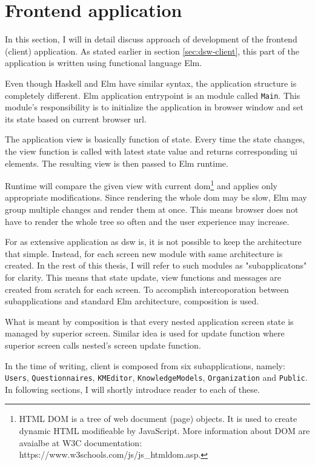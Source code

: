 \section{Frontend application}\label{sec:frontend-application}

In this section, I will in detail discuss approach of development of the frontend (client) application.
As stated earlier in section \ref{sec:dsw-client}, this part of the application is written using functional language Elm.

Even though Haskell and Elm have similar syntax, the application structure is completely different.
Elm application entrypoint is an module called \texttt{Main}.
This module's responsibility is to initialize the application in browser window and set its state based on current browser \gls{url}.

The application view is basically function of state.
Every time the state changes, the view function is called with latest state value and returns corresponding \gls{ui} elements.
The resulting view is then passed to Elm runtime.

Runtime will compare the given view with current \gls{dom}\footnote{HTML DOM is a tree of web document (page) objects. It is used to create dynamic HTML modifieable by JavaScript. More information about DOM are avaialbe at W3C documentation: https://www.w3schools.com/js/js\_htmldom.asp.} and applies only appropriate modifications.
Since rendering the whole \gls{dom} may be slow\cite{accelebrate-slow-dom}, Elm may group multiple changes and render them at once.
This means browser does not have to render the whole tree so often and the user experience may increase.

For as extensive application as \gls{dsw} is, it is not possible to keep the architecture that simple.
Instead, for each screen new module with same architecture is created.
In the rest of this thesis, I will refer to such modules as "subapplicatons" for clarity.
This means that state update, view functions and messages are created from scratch for each screen.
To accomplish intercoporation between subapplications and standard Elm architecture, composition is used.

What is meant by composition is that every nested application screen state is managed by superior screen.
Similar idea is used for update function where superior screen calls nested's screen update function.

In the time of writing, client is composed from six subapplications, namely: \texttt{Users}, \texttt{Questionnaires}, \texttt{KMEditor}, \texttt{KnowledgeModels}, \texttt{Organization} and \texttt{Public}.
In following sections, I will shortly introduce reader to each of these.


